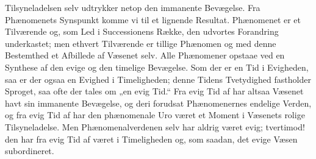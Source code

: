 \documentclass[12pt]{book}
\begin{document}
Tilsyneladelsen selv udtrykker netop den immanente Bevægelse. Fra Phænomenets
Synspunkt komme vi til et lignende Resultat. Phænomenet er et Tilværende og, som Led
i Successionens Række, den udvortes Forandring underkastet; men ethvert Tilværende er
tillige Phænomen og med denne Bestemthed et Afbillede af Væsenet selv. Alle
Phænomener opstaae ved en Synthese af den evige og den timelige Bevægelse. Som der er
en Tid i Evigheden, saa er der ogsaa en Evighed i Timeligheden; denne Tidens
Tvetydighed fastholder Sproget, saa ofte der tales om „en evig Tid.“ Fra evig Tid af
har altsaa Væsenet havt sin immanente Bevægelse, og deri forudsat Phænomenernes
endelige Verden, og fra evig Tid af har den phænomenale Uro været et Moment i
Væsenets rolige Tilsyneladelse. Men Phænomenalverdenen selv har aldrig været evig;
tvertimod! den har fra evig Tid af været i Timeligheden og, som saadan, det evige
Væsen subordineret.
\end{document}
